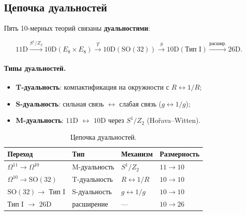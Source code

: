 \documentclass[11pt,a4paper]{article}
\newcommand{\SO}{\mathrm{SO}}
\newcommand{\Omt}{\Omega^{10}}
\newcommand{\Ome}{\Omega^{11}}
\theoremstyle{definition}
\begin{document}
\subsection{Цепочка дуальностей}
\label{subsec:duality-chain}

Пять 10-мерных теорий связаны \textbf{дуальностями}:

\begin{equation}
    \boxed{
    11\text{D} \xrightarrow{S^1/Z_2} 
    10\text{D}(E_8 \times E_8) \xrightarrow{T} 
    10\text{D}(\SO(32)) \xrightarrow{S} 
    10\text{D}(\text{Тип I}) \xrightarrow{\text{расшир.}} 
    26\text{D}.
    }
    \label{eq:duality-chain}
\end{equation}

\paragraph{Типы дуальностей.}
\begin{itemize}
    \item \textbf{T-дуальность}: компактификация на окружности 
          с $R \leftrightarrow 1/R$;
    \item \textbf{S-дуальность}: сильная связь $\leftrightarrow$ 
          слабая связь ($g \leftrightarrow 1/g$);
    \item \textbf{M-дуальность}: $11$D $\leftrightarrow$ $10$D 
          через $S^1/Z_2$ (Hořava--Witten).
\end{itemize}

\begin{table}[htbp]
\centering
\caption{Цепочка дуальностей.}
\label{tab:dualities}
\begin{tabular}{llll}
\toprule
Переход & Тип & Механизм & Размерность \\
\midrule
$\Ome \to \Omt$ & M-дуальность & $S^1/Z_2$ & $11 \to 10$ \\
$\Omt \to \SO(32)$ & T-дуальность & $R \leftrightarrow 1/R$ & $10 \to 10$ \\
$\SO(32) \to$ Тип I & S-дуальность & $g \leftrightarrow 1/g$ & $10 \to 10$ \\
Тип I $\to$ $26$D & расширение & --- & $10 \to 26$ \\
\bottomrule
\end{tabular}
\end{table}
\end{document}
